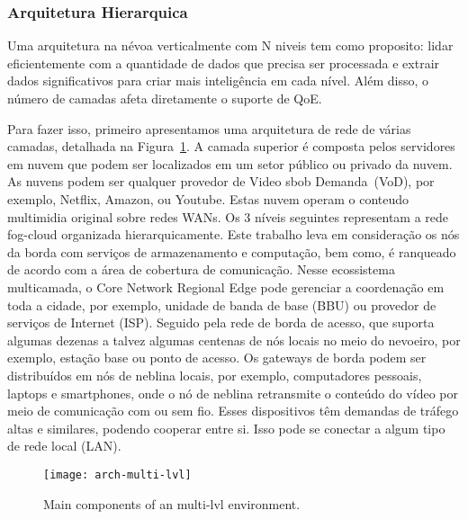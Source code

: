 \subsubsection{Arquitetura Hierarquica}
Uma arquitetura na névoa verticalmente com N niveis tem como proposito: lidar eficientemente com a quantidade de dados que precisa ser processada e extrair dados significativos para criar mais inteligência em cada nível. Além disso, o número de camadas afeta diretamente o suporte de QoE.

Para fazer isso, primeiro apresentamos uma arquitetura de rede de várias camadas, detalhada na Figura~\ref{fig:arch-multi-lvl}. A camada superior é composta pelos servidores em nuvem que podem ser localizados em um setor público ou privado da nuvem. As nuvens podem ser qualquer provedor de Video sbob Demanda~(VoD), por exemplo, Netflix, Amazon, ou Youtube. Estas nuvem operam o conteudo multimidia original sobre redes WANs. Os 3 níveis seguintes representam a rede fog-cloud organizada hierarquicamente. Este  trabalho leva em consideração os nós da borda com serviços de armazenamento e computação, bem como, é ranqueado de acordo com a área de cobertura de comunicação. Nesse ecossistema multicamada, o Core Network Regional Edge pode gerenciar a coordenação em toda a cidade, por exemplo, unidade de banda de base (BBU) ou provedor de serviços de Internet (ISP). Seguido pela rede de borda de acesso, que suporta algumas dezenas a talvez algumas centenas de nós locais no meio do nevoeiro, por exemplo, estação base ou ponto de acesso. Os gateways de borda podem ser distribuídos em nós de neblina locais, por exemplo, computadores pessoais, laptops e smartphones, onde o nó de neblina retransmite o conteúdo do vídeo por meio de comunicação com ou sem fio. Esses dispositivos têm demandas de tráfego altas e similares, podendo cooperar entre si. Isso pode se conectar a algum tipo de rede local (LAN).

\begin{figure}[htb]
  \centering
  \texttt{[image: arch-multi-lvl]}
  \caption{Main components of an multi-lvl environment.}
  \label{fig:arch-multi-lvl}
\end{figure}

